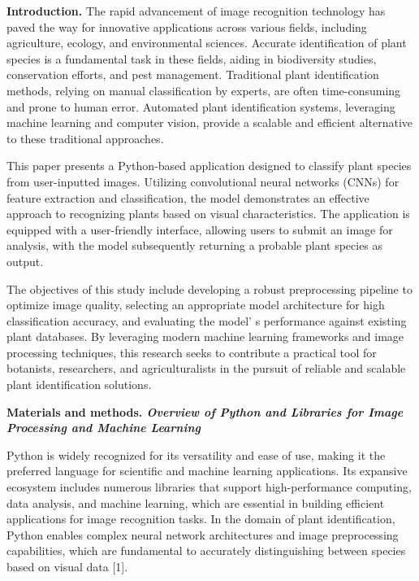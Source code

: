 \begin{multicols}{2}
{\bfseries Introduction.} The rapid advancement of image recognition
technology has paved the way for innovative applications across various
fields, including agriculture, ecology, and environmental sciences.
Accurate identification of plant species is a fundamental task in these
fields, aiding in biodiversity studies, conservation efforts, and pest
management. Traditional plant identification methods, relying on manual
classification by experts, are often time-consuming and prone to human
error. Automated plant identification systems, leveraging machine
learning and computer vision, provide a scalable and efficient
alternative to these traditional approaches.

This paper presents a Python-based application designed to classify
plant species from user-inputted images. Utilizing convolutional neural
networks (CNNs) for feature extraction and classification, the model
demonstrates an effective approach to recognizing plants based on visual
characteristics. The application is equipped with a user-friendly
interface, allowing users to submit an image for analysis, with the
model subsequently returning a probable plant species as output.

The objectives of this study include developing a robust preprocessing
pipeline to optimize image quality, selecting an appropriate model
architecture for high classification accuracy, and evaluating the
model' s performance against existing plant databases. By
leveraging modern machine learning frameworks and image processing
techniques, this research seeks to contribute a practical tool for
botanists, researchers, and agriculturalists in the pursuit of reliable
and scalable plant identification solutions.

{\bfseries Materials and methods. \emph{Overview of Python and Libraries
for Image Processing and Machine Learning}}

Python is widely recognized for its versatility and ease of use, making
it the preferred language for scientific and machine learning
applications. Its expansive ecosystem includes numerous libraries that
support high-performance computing, data analysis, and machine learning,
which are essential in building efficient applications for image
recognition tasks. In the domain of plant identification, Python enables
complex neural network architectures and image preprocessing
capabilities, which are fundamental to accurately distinguishing between
species based on visual data {[}1{]}.


\end{multicols}
